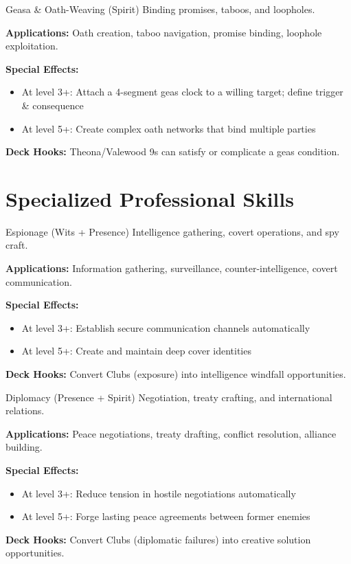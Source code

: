 \documentclass[11pt]{report}
\begin{document}
\begin{skillbox}{Geasa \& Oath-Weaving (Spirit)}
Binding promises, taboos, and loopholes.

\textbf{Applications:} Oath creation, taboo navigation, promise binding, loophole exploitation.

\textbf{Special Effects:}
\begin{itemize}
    \item At level 3+: Attach a 4-segment geas clock to a willing target; define trigger \& consequence
    \item At level 5+: Create complex oath networks that bind multiple parties
\end{itemize}

\textbf{Deck Hooks:} Theona/Valewood 9s can satisfy or complicate a geas condition.
\end{skillbox}

\section{Specialized Professional Skills}

\begin{skillbox}{Espionage (Wits + Presence)}
Intelligence gathering, covert operations, and spy craft.

\textbf{Applications:} Information gathering, surveillance, counter-intelligence, covert communication.

\textbf{Special Effects:}
\begin{itemize}
    \item At level 3+: Establish secure communication channels automatically
    \item At level 5+: Create and maintain deep cover identities
\end{itemize}

\textbf{Deck Hooks:} Convert Clubs (exposure) into intelligence windfall opportunities.
\end{skillbox}

\begin{skillbox}{Diplomacy (Presence + Spirit)}
Negotiation, treaty crafting, and international relations.

\textbf{Applications:} Peace negotiations, treaty drafting, conflict resolution, alliance building.

\textbf{Special Effects:}
\begin{itemize}
    \item At level 3+: Reduce tension in hostile negotiations automatically
    \item At level 5+: Forge lasting peace agreements between former enemies
\end{itemize}

\textbf{Deck Hooks:} Convert Clubs (diplomatic failures) into creative solution opportunities.
\end{skillbox}
\end{document}

